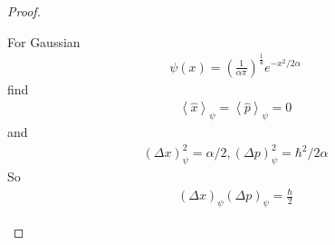 \documentclass[a4paper]{article}
\begin{document}
\begin{proof}
\begin{eg}
For Gaussian
\begin{equation*}
\begin{aligned}
\psi\left(x\right) = \left(\frac{1}{\alpha\pi}\right)^\frac{1}{4} e^{-x^2/2\alpha}
\end{aligned}
\end{equation*}
find
\begin{equation*}
\begin{aligned}
\left<\hat{x}\right>_\psi = \left<\hat{p}\right>_\psi = 0
\end{aligned}
\end{equation*}
and
\begin{equation*}
\begin{aligned}
\left(\Delta x\right)_\psi^2 = \alpha/2,\left(\Delta p\right)_\psi^2 = \hbar^2 / 2\alpha
\end{aligned}
\end{equation*}
So
\begin{equation*}
\begin{aligned}
\left(\Delta x\right)_\psi \left(\Delta p\right)_\psi = \frac{\hbar}{2}
\end{aligned}
\end{equation*}
\end{eg}

\end{proof}
\end{document}
